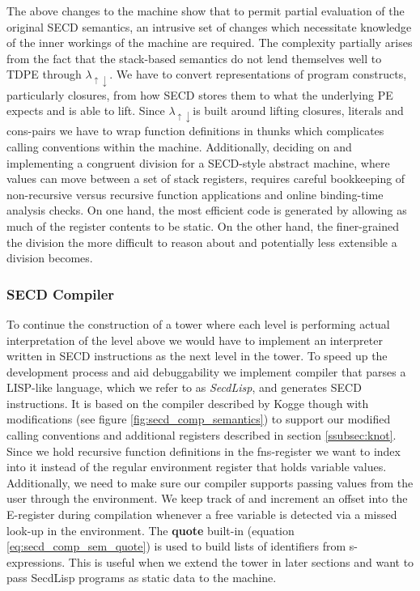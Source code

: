 \documentclass[a4paper,12pt,twoside,openright]{report}
\theoremstyle{definition}
\newcommand{\mslang}{$\lambda_{\uparrow\downarrow}$}
\newcommand{\secdlisp}{SecdLisp}
\begin{document}
The above changes to the machine show that to permit partial evaluation of the original SECD semantics, an intrusive set of changes which necessitate knowledge of the inner workings of the machine are required. The complexity partially arises from the fact that the stack-based semantics do not lend themselves well to TDPE through \mslang. We have to convert representations of program constructs, particularly closures, from how SECD stores them to what the underlying PE expects and is able to lift. Since \mslang is built around lifting closures, literals and cons-pairs we have to wrap function definitions in thunks which complicates calling conventions within the machine. Additionally, deciding on and implementing a congruent division for a SECD-style abstract machine, where values can move between a set of stack registers, requires careful bookkeeping of non-recursive versus recursive function applications and online binding-time analysis checks. On one hand, the most efficient code is generated by allowing as much of the register contents to be static. On the other hand, the finer-grained the division the more difficult to reason about and potentially less extensible a division becomes.

\subsubsection{SECD Compiler}\label{subsec:secd_comp}
To continue the construction of a tower where each level is performing actual interpretation of the level above we would have to implement an interpreter written in SECD instructions as the next level in the tower. To speed up the development process and aid debuggability we implement compiler that parses a LISP-like language, which we refer to as \textit{\secdlisp{}}, and generates SECD instructions. It is based on the compiler described by Kogge \cite{kogge1990architecture} though with modifications (see figure \ref{fig:secd_comp_semantics}) to support our modified calling conventions and additional registers described in section \ref{ssubsec:knot}. Since we hold recursive function definitions in the fns-register we want to index into it instead of the regular environment register that holds variable values. Additionally, we need to make sure our compiler supports passing values from the user through the environment. We keep track of and increment an offset into the E-register during compilation whenever a free variable is detected via a missed look-up in the environment. The \textbf{quote} built-in (equation \ref{eq:secd_comp_sem_quote}) is used to build lists of identifiers from s-expressions. This is useful when we extend the tower in later sections and want to pass \secdlisp{} programs as static data to the machine.
\end{document}
